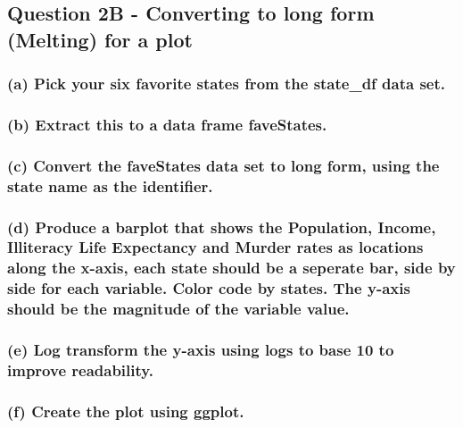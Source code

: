 \documentclass[
]{article}
\begin{document}
\subsection{Question 2B - Converting to long form (Melting) for a
plot}\label{question-2b---converting-to-long-form-melting-for-a-plot}

\subsubsection{(a) Pick your six favorite states from the state\_df data
set.}\label{a-pick-your-six-favorite-states-from-the-state_df-data-set.}

\subsubsection{(b) Extract this to a data frame
faveStates.}\label{b-extract-this-to-a-data-frame-favestates.}

\subsubsection{(c) Convert the faveStates data set to long form, using
the state name as the
identifier.}\label{c-convert-the-favestates-data-set-to-long-form-using-the-state-name-as-the-identifier.}

\subsubsection{(d) Produce a barplot that shows the Population, Income,
Illiteracy Life Expectancy and Murder rates as locations along the
x-axis, each state should be a seperate bar, side by side for each
variable. Color code by states. The y-axis should be the magnitude of
the variable
value.}\label{d-produce-a-barplot-that-shows-the-population-income-illiteracy-life-expectancy-and-murder-rates-as-locations-along-the-x-axis-each-state-should-be-a-seperate-bar-side-by-side-for-each-variable.-color-code-by-states.-the-y-axis-should-be-the-magnitude-of-the-variable-value.}

\subsubsection{(e) Log transform the y-axis using logs to base 10 to
improve
readability.}\label{e-log-transform-the-y-axis-using-logs-to-base-10-to-improve-readability.}

\subsubsection{(f) Create the plot using
ggplot.}\label{f-create-the-plot-using-ggplot.}
\end{document}
